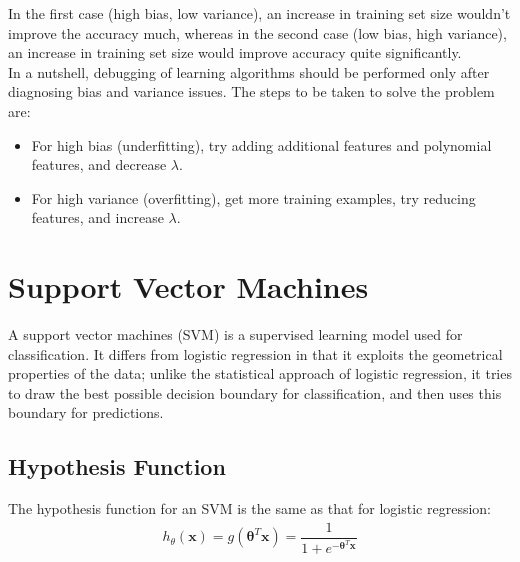 \documentclass[a4paper, 12pt]{article}
\begin{document}
In the first case (high bias, low variance), an increase in training set size wouldn't improve the accuracy much, whereas in the second case (low bias, high variance), an increase in training set size would improve accuracy quite significantly. \\
\break
In a nutshell, debugging of learning algorithms should be performed only after diagnosing bias and variance issues. The steps to be taken to solve the problem are:
\begin{itemize}
\item For high bias (underfitting), try adding additional features and polynomial features, and decrease $\lambda$.
\item For high variance (overfitting), get more training examples, try reducing features, and increase $\lambda$.
\end{itemize}


\section{Support Vector Machines}
A support vector machines (SVM) is a supervised learning model used for classification. It differs from logistic regression in that it exploits the geometrical properties of the data; unlike the statistical approach of logistic regression, it tries to draw the best possible decision boundary for classification, and then uses this boundary for predictions.

\subsection{Hypothesis Function}
The hypothesis function for an SVM is the same as that for logistic regression:
\begin{align*}
h_{\theta}\left(\bm{x}\right) = g\left(\bm{\theta}^T\bm{x}\right) = \dfrac{1}{1+e^{-\bm{\theta}^T\bm{x}}}
\end{align*}
\end{document}
